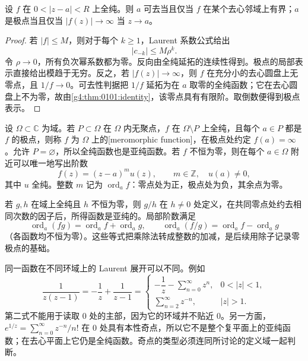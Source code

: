 \begin{proposition}\label{g4:prop:0102:singularity-tests}
	设 \(f\) 在 \(0<|z-a|<R\) 上全纯。则 \(a\) 可去当且仅当 \(f\) 在某个去心邻域上有界；\(a\) 是极点当且仅当 \(|f(z)|\rightarrow\infty\) 当 \(z\rightarrow a\)。
\end{proposition}
\begin{proof}
	若 \(|f|\leq M\)，则对于每个 \(k\geq1\)，Laurent 系数公式给出
	\[
		|c_{-k}|\leq M\rho^k.
	\]
	令 \(\rho\rightarrow0\)，所有负次幂系数都为零。反向由全纯延拓的连续性得到。极点的局部表示直接给出模趋于无穷。反之，若 \(|f(z)|\rightarrow\infty\)，则 \(f\) 在充分小的去心圆盘上无零点，且 \(1/f\rightarrow0\)。可去性判据把 \(1/f\) 延拓为在 \(a\) 取零的全纯函数；它在去心圆盘上不为零，故由\cref{g4:thm:0101:identity}，该零点具有有限阶。取倒数便得到极点表示。
\end{proof}

\begin{definition}\label{g4:def:0102:meromorphic}
	设 \(\Omega\subset\mathbb C\) 为域。若 \(P\subset\Omega\) 在 \(\Omega\) 内无聚点，\(f\) 在 \(\Omega\setminus P\) 上全纯，且每个 \(a\in P\) 都是 \(f\) 的极点，则称 \(f\) 为 \(\Omega\) 上的[meromorphic function]，在极点处约定 \(f(a)=\infty\)。允许 \(P=\varnothing\)，所以全纯函数也是亚纯函数。若 \(f\) 不恒为零，则在每个 \(a\in\Omega\) 附近可以唯一地写出阶数
	\[
		f(z)=(z-a)^m u(z),\qquad m\in\mathbb Z,\quad u(a)\neq0,
	\]
	其中 \(u\) 全纯。整数 \(m\) 记为 \(\operatorname{ord}_a f\)：零点处为正，极点处为负，其余点为零。
\end{definition}

若 \(g,h\) 在域上全纯且 \(h\) 不恒为零，则 \(g/h\) 在 \(h\neq0\) 处定义，在共同零点处约去相同次数的因子后，所得函数是亚纯的。局部阶数满足
\[
	\operatorname{ord}_a(fg)=\operatorname{ord}_a f+\operatorname{ord}_a g,
	\qquad
	\operatorname{ord}_a(f/g)=\operatorname{ord}_a f-\operatorname{ord}_a g
\]
（各函数均不恒为零）。这些等式把乘除法转成整数的加减，是后续用除子记录零极点的基础。

\begin{example}\label{g4:exm:0102:laurent-domains}
	同一函数在不同环域上的 Laurent 展开可以不同。例如
	\[
		\frac{1}{z(z-1)}=-\frac1z+\frac1{z-1}
		=\begin{cases}
			-\dfrac1z-\displaystyle\sum_{n=0}^{\infty}z^n,&0<|z|<1,\\[6pt]
			\displaystyle\sum_{n=2}^{\infty}z^{-n},&|z|>1.
		\end{cases}
	\]
	第二式不能用于读取 \(0\) 处的主部，因为它的环域并不贴近 \(0\)。另一方面，\(e^{1/z}=\sum_{n=0}^{\infty}z^{-n}/n!\) 在 \(0\) 处具有本性奇点，所以它不是整个复平面上的亚纯函数；在去心平面上它仍是全纯函数。奇点的类型必须连同所讨论的定义域一起判断。
\end{example}

